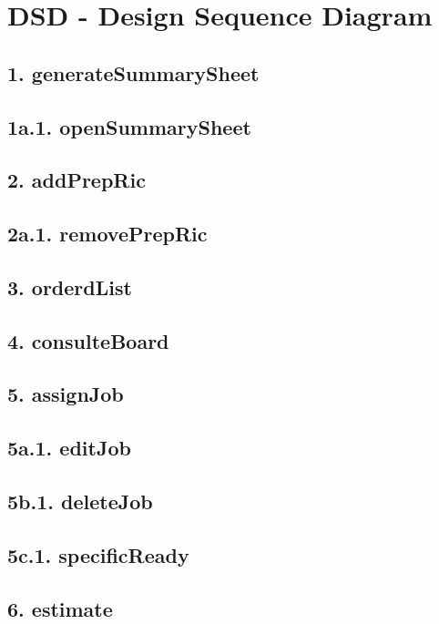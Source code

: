 \chapter{DSD - Design Sequence Diagram}

\section{1. generateSummarySheet}

\section{1a.1. openSummarySheet}

\section{2. addPrepRic}

\section{2a.1. removePrepRic}

\section{3. orderdList}

\section{4. consulteBoard}

\section{5. assignJob}

\section{5a.1. editJob}

\section{5b.1. deleteJob}

\section{5c.1. specificReady}

\section{6. estimate}
